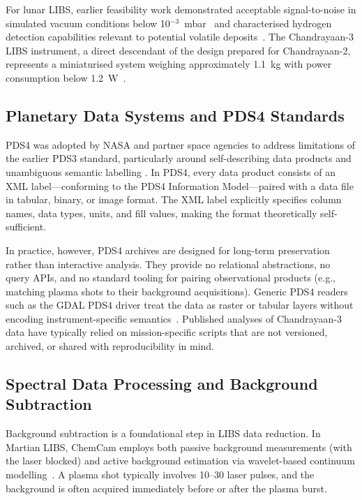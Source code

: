 \documentclass[a4paper,twocolumn,10pt]{article}
\begin{document}
For lunar LIBS, earlier feasibility work demonstrated acceptable
signal-to-noise in simulated vacuum conditions below
10$^{-3}$~mbar~\cite{Knight2000,Lasue2012} and characterised
hydrogen detection capabilities relevant to potential volatile
deposits~\cite{Yumoto2023}.  The Chandrayaan-3 LIBS instrument, a
direct descendant of the design prepared for Chandrayaan-2, represents
a miniaturised system weighing approximately 1.1~kg with power
consumption below 1.2~W~\cite{Laxmiprasad2020}.

\subsection{Planetary Data Systems and PDS4 Standards}

PDS4 was adopted by NASA and partner space agencies to address
limitations of the earlier PDS3 standard, particularly around
self-describing data products and unambiguous semantic labelling
\cite{Hughes2018}.  In PDS4, every data product consists of an XML
label---conforming to the PDS4 Information Model---paired with a data
file in tabular, binary, or image format.  The XML label explicitly
specifies column names, data types, units, and fill values, making
the format theoretically self-sufficient.

In practice, however, PDS4 archives are designed for long-term
preservation rather than interactive analysis.  They provide no
relational abstractions, no query APIs, and no standard tooling for
pairing observational products (e.g., matching plasma shots to their
background acquisitions).  Generic PDS4 readers such as the GDAL PDS4
driver treat the data as raster or tabular layers without encoding
instrument-specific semantics~\cite{GDALPDS4}.  Published analyses of
Chandrayaan-3 data have typically relied on mission-specific scripts
that are not versioned, archived, or shared with reproducibility in
mind.

\subsection{Spectral Data Processing and Background Subtraction}

Background subtraction is a foundational step in LIBS data reduction.
In Martian LIBS, ChemCam employs both passive background measurements
(with the laser blocked) and active background estimation via
wavelet-based continuum modelling~\cite{Clegg2017}.  A plasma shot
typically involves 10--30 laser pulses, and the background is often
acquired immediately before or after the plasma burst.
\end{document}
